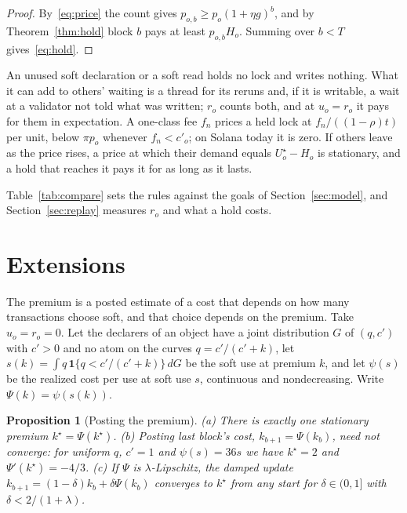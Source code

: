 \documentclass[conference,compsoc]{IEEEtran}
\numberwithin{equation}{section}
\theoremstyle{plain}
\newtheorem{proposition}[theorem]{Proposition}
\theoremstyle{definition}
\theoremstyle{remark}
\newcommand{\cp}{c'}
\begin{document}
\begin{proof}
By~\eqref{eq:price} the count gives $p_{o,b} \ge p_o (1+\eta g)^b$, and by Theorem~\ref{thm:hold} block $b$ pays at least $p_{o,b} H_o$. Summing over $b < T$ gives~\eqref{eq:hold}.
\end{proof}

An unused soft declaration or a soft read holds no lock and writes nothing. What it can add to others' waiting is a thread for its reruns and, if it is writable, a wait at a validator not told what was written; $r_o$ counts both, and at $u_o = r_o$ it pays for them in expectation. A one-class fee $f_n$ prices a held lock at $f_n/((1-\rho)t)$ per unit, below $\pi p_o$ whenever $f_n < \cp_o$; on Solana today it is zero. If others leave as the price rises, a price at which their demand equals $U^\star_o - H_o$ is stationary, and a hold that reaches it pays it for as long as it lasts.

Table~\ref{tab:compare} sets the rules against the goals of Section~\ref{sec:model}, and Section~\ref{sec:replay} measures $r_o$ and what a hold costs.



\section{Extensions}\label{sec:caps}

The premium is a posted estimate of a cost that depends on how many transactions choose soft, and that choice depends on the premium. Take $u_o = r_o = 0$. Let the declarers of an object have a joint distribution $G$ of $(q, \cp)$ with $\cp > 0$ and no atom on the curves $q = \cp/(\cp + k)$, let $s(k) = \int q\,\mathbf{1}\{q < \cp/(\cp + k)\}\,dG$ be the soft use at premium $k$, and let $\psi(s)$ be the realized cost per use at soft use $s$, continuous and nondecreasing. Write $\Psi(k) = \psi(s(k))$.

\begin{proposition}[Posting the premium]\label{prop:premium}
\textup{(a)} There is exactly one stationary premium $k^\star = \Psi(k^\star)$. \textup{(b)} Posting last block's cost, $k_{b+1} = \Psi(k_b)$, need not converge: for uniform $q$, $\cp = 1$ and $\psi(s) = 36 s$ we have $k^\star = 2$ and $\Psi'(k^\star) = -4/3$. \textup{(c)} If $\Psi$ is $\lambda$-Lipschitz, the damped update $k_{b+1} = (1-\delta)k_b + \delta \Psi(k_b)$ converges to $k^\star$ from any start for $\delta \in (0,1]$ with $\delta < 2/(1+\lambda)$.
\end{proposition}
\end{document}
